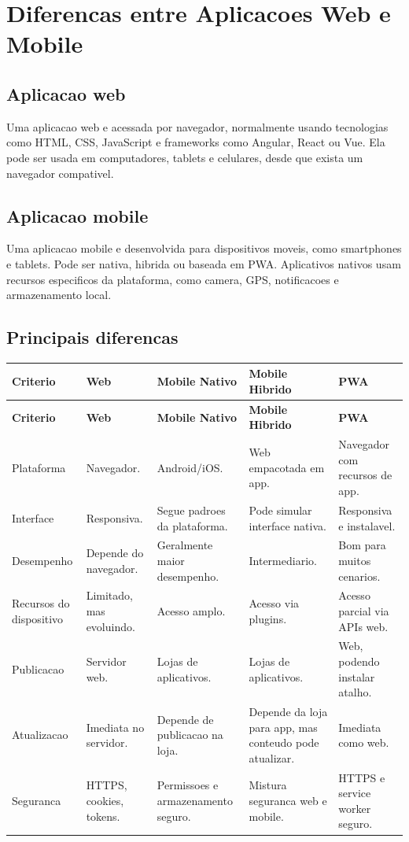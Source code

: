 \documentclass[12pt,a4paper]{article}
\begin{document}
\section{Diferencas entre Aplicacoes Web e Mobile}

\subsection{Aplicacao web}

Uma aplicacao web e acessada por navegador, normalmente usando tecnologias como HTML, CSS, JavaScript e frameworks como Angular, React ou Vue. Ela pode ser usada em computadores, tablets e celulares, desde que exista um navegador compativel.

\subsection{Aplicacao mobile}

Uma aplicacao mobile e desenvolvida para dispositivos moveis, como smartphones e tablets. Pode ser nativa, hibrida ou baseada em PWA. Aplicativos nativos usam recursos especificos da plataforma, como camera, GPS, notificacoes e armazenamento local.

\subsection{Principais diferencas}

\begin{longtable}{@{}L{3.2cm}L{3.4cm}L{3.4cm}L{3.4cm}L{3.4cm}@{}}
\toprule
\textbf{Criterio} & \textbf{Web} & \textbf{Mobile Nativo} & \textbf{Mobile Hibrido} & \textbf{PWA} \\
\midrule
\endfirsthead
\toprule
\textbf{Criterio} & \textbf{Web} & \textbf{Mobile Nativo} & \textbf{Mobile Hibrido} & \textbf{PWA} \\
\midrule
\endhead
Plataforma & Navegador. & Android/iOS. & Web empacotada em app. & Navegador com recursos de app. \\
Interface & Responsiva. & Segue padroes da plataforma. & Pode simular interface nativa. & Responsiva e instalavel. \\
Desempenho & Depende do navegador. & Geralmente maior desempenho. & Intermediario. & Bom para muitos cenarios. \\
Recursos do dispositivo & Limitado, mas evoluindo. & Acesso amplo. & Acesso via plugins. & Acesso parcial via APIs web. \\
Publicacao & Servidor web. & Lojas de aplicativos. & Lojas de aplicativos. & Web, podendo instalar atalho. \\
Atualizacao & Imediata no servidor. & Depende de publicacao na loja. & Depende da loja para app, mas conteudo pode atualizar. & Imediata como web. \\
Seguranca & HTTPS, cookies, tokens. & Permissoes e armazenamento seguro. & Mistura seguranca web e mobile. & HTTPS e service worker seguro. \\
\bottomrule
\end{longtable}
\end{document}
